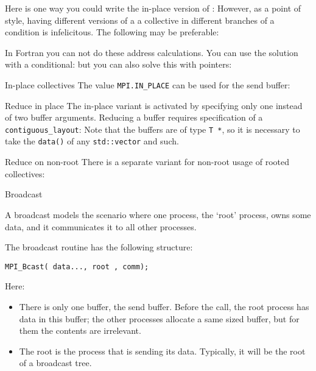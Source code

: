 Here is one way you could write the in-place version of :
%
%
However, as a point of style, having different versions of a a collective
in different branches of a condition is infelicitous. The following may be preferable:
%

In Fortran  you can not do these address calculations.
You can use the solution with a conditional:
%
%
but you can also solve this with pointers:
%

\begin{pythonnote}{In-place collectives}
  The value \lstinline+MPI.IN_PLACE+ can be used for the send buffer:
\end{pythonnote}

\begin{mplnote}{Reduce in place}
  The in-place variant is activated by
  specifying only one instead of two buffer arguments.
  Reducing a buffer requires specification of a \lstinline+contiguous_layout+:
  Note that the buffers are of type \lstinline+T *+, so it is necessary
  to take the \lstinline+data()+ of any \lstinline+std::vector+ and such.
\end{mplnote}

\begin{mplnote}{Reduce on non-root}
  There is a separate variant for non-root usage of rooted collectives:
\end{mplnote}

 {Broadcast}
\label{sec:bcast}

A broadcast models the scenario where one process,
the `root' process,
owns some data, and it communicates it to all other processes.

The broadcast routine
has the following structure:
\begin{lstlisting}
MPI_Bcast( data..., root , comm);
\end{lstlisting}
Here:
\begin{itemize}
\item There is only one buffer, the send buffer.
  Before the call, the root process has data in this buffer;
  the other processes allocate a same sized buffer, but
  for them the contents are irrelevant.
\item 
  The root is the process that is sending its data.
  Typically, it will be the root of a broadcast tree.
\end{itemize}

